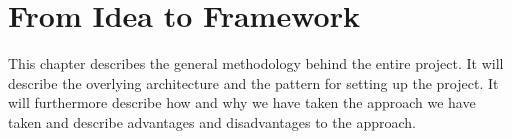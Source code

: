 \chapter{From Idea to Framework}

This chapter describes the general methodology behind the entire project. It will describe the overlying architecture and the pattern for setting up the project. It will furthermore describe how and why we have taken the approach we have taken and describe advantages and disadvantages to the approach. 


